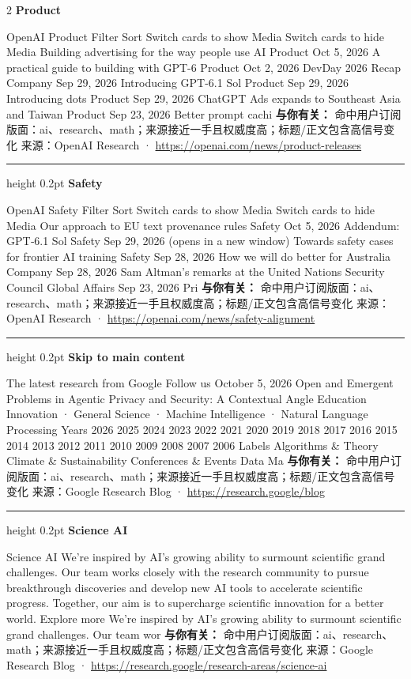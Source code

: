 \documentclass[10.5pt]{ctexart}
\begin{document}
\begin{multicols}{2}
{\large\bfseries Product}\par
OpenAI Product Filter Sort Switch cards to show Media Switch cards to hide Media Building advertising for the way people use AI Product Oct 5, 2026 A practical guide to building with GPT-6 Product Oct 2, 2026 DevDay 2026 Recap Company Sep 29, 2026 Introducing GPT-6.1 Sol Product Sep 29, 2026 Introducing dots Product Sep 29, 2026 ChatGPT Ads expands to Southeast Asia and Taiwan Product Sep 23, 2026 Better prompt cachi
\textbf{与你有关：} 命中用户订阅版面：ai、research、math；来源接近一手且权威度高；标题/正文包含高信号变化
{\footnotesize\color{ormuted} 来源：OpenAI Research · \url{https://openai.com/news/product-releases}}
\vspace{2mm}
\hrule height 0.2pt
\vspace{2mm}
{\large\bfseries Safety}\par
OpenAI Safety Filter Sort Switch cards to show Media Switch cards to hide Media Our approach to EU text provenance rules Safety Oct 5, 2026 Addendum: GPT‑6.1 Sol Safety Sep 29, 2026 (opens in a new window) Towards safety cases for frontier AI training Safety Sep 28, 2026 How we will do better for Australia Company Sep 28, 2026 Sam Altman’s remarks at the United Nations Security Council Global Affairs Sep 23, 2026 Pri
\textbf{与你有关：} 命中用户订阅版面：ai、research、math；来源接近一手且权威度高；标题/正文包含高信号变化
{\footnotesize\color{ormuted} 来源：OpenAI Research · \url{https://openai.com/news/safety-alignment}}
\vspace{2mm}
\hrule height 0.2pt
\vspace{2mm}
{\large\bfseries Skip to main content}\par
The latest research from Google Follow us October 5, 2026 Open and Emergent Problems in Agentic Privacy and Security: A Contextual Angle Education Innovation · General Science · Machine Intelligence · Natural Language Processing Years 2026 2025 2024 2023 2022 2021 2020 2019 2018 2017 2016 2015 2014 2013 2012 2011 2010 2009 2008 2007 2006 Labels Algorithms \& Theory Climate \& Sustainability Conferences \& Events Data Ma
\textbf{与你有关：} 命中用户订阅版面：ai、research、math；来源接近一手且权威度高；标题/正文包含高信号变化
{\footnotesize\color{ormuted} 来源：Google Research Blog · \url{https://research.google/blog}}
\vspace{2mm}
\hrule height 0.2pt
\vspace{2mm}
{\large\bfseries Science AI}\par
Science AI We’re inspired by AI’s growing ability to surmount scientific grand challenges. Our team works closely with the research community to pursue breakthrough discoveries and develop new AI tools to accelerate scientific progress. Together, our aim is to supercharge scientific innovation for a better world. Explore more We’re inspired by AI’s growing ability to surmount scientific grand challenges. Our team wor
\textbf{与你有关：} 命中用户订阅版面：ai、research、math；来源接近一手且权威度高；标题/正文包含高信号变化
{\footnotesize\color{ormuted} 来源：Google Research Blog · \url{https://research.google/research-areas/science-ai}}
\end{multicols}
\end{document}
